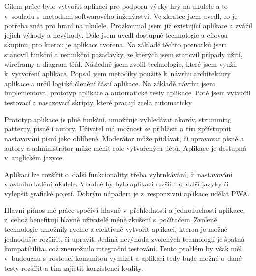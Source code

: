 \begin{conclusion}
    Cílem práce bylo vytvořit aplikaci pro podporu výuky hry na ukulele a to v~souladu s~metodami softwarového inženýrství. Ve zkratce jsem uvedl, co je potřeba znát pro hraní na ukulele. Prozkoumal jsem již existující aplikace a zvážil jejich výhody a nevýhody. Dále jsem uvedl dostupné technologie a cílovou skupinu, pro kterou je aplikace tvořena. Na základě těchto poznatků jsem stanovil funkční a nefunkční požadavky, ze kterých jsem stanovil případy užití, wireframy a diagram tříd. Následně jsem zvolil technologie, které jsem využil k~vytvoření aplikace. Popsal jsem metodiky použité k~návrhu architektury aplikace a určil logické členění částí aplikace. Na základě návrhu jsem implementoval prototyp aplikace a automatické testy aplikace. Poté jsem vytvořil testovací a nasazovací skripty, které pracují zcela automaticky.

    Prototyp aplikace je plně funkční, umožňuje vyhledávat akordy, strumming patterny, písně i autory. Uživatel má možnost se přihlásit a tím zpřístupnit nastavování písní jako oblíbené. Moderátor může přidávat, či upravovat písně a autory a administrátor může měnit role vytvořených účtů. Aplikace je dostupná v~anglickém jazyce.

    Aplikaci lze rozšířit o~další funkcionality, třeba vybrnkávání, či nastavování vlastního ladění ukulele. Vhodné by bylo aplikaci rozšířit o~další jazyky či vylepšit grafické pojetí. Dobrým nápadem je z~responzivní aplikace udělat PWA.

    Hlavní přínos mé práce spočívá hlavně v~přehlednosti a jednoduchosti aplikace, z~cehož benefitují hlavně uživatelé méně zkušení s~počítačem. Zvolené technologie umožnily rychle a efektivně vytvořit aplikaci, kterou je možné jednodušše rozšířit, či upravit. Jediná nevýhoda zvolených technologií je špatná kompatibilita, což znemožnilo integrační testování. Tento problém by však měl v~budoucnu s~rostoucí komunitou vymizet a aplikaci tedy bude možné o~dané testy rozšířit a tím zajistit konzistenci kvality.
\end{conclusion}